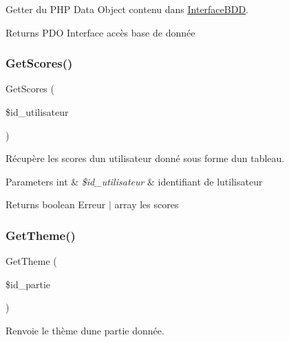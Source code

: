 Getter du P\+HP Data Object contenu dans \mbox{\hyperlink{class_interface_b_d_d}{Interface\+B\+DD}}. 

\begin{DoxyReturn}{Returns}
P\+DO Interface accès base de donnée 
\end{DoxyReturn}
\mbox{\label{class_interface_b_d_d_a0bed09747595044e2aef3e3ce363c126}} 
\subsubsection{\texorpdfstring{Get\+Scores()}{GetScores()}}
{\footnotesize\ttfamily Get\+Scores (\begin{DoxyParamCaption}\item[{}]{\$id\+\_\+utilisateur }\end{DoxyParamCaption})}



Récupère les scores d\textquotesingle{}un utilisateur donné sous forme d\textquotesingle{}un tableau. 


\begin{DoxyParams}[1]{Parameters}
int & {\em \$id\+\_\+utilisateur} & identifiant de l\textquotesingle{}utilisateur\\
\hline
\end{DoxyParams}
\begin{DoxyReturn}{Returns}
boolean Erreur $\vert$ array les scores 
\end{DoxyReturn}
\mbox{\label{class_interface_b_d_d_aa0363b9684feb940bb3ad88fc322bdc8}} 
\subsubsection{\texorpdfstring{Get\+Theme()}{GetTheme()}}
{\footnotesize\ttfamily Get\+Theme (\begin{DoxyParamCaption}\item[{}]{\$id\+\_\+partie }\end{DoxyParamCaption})}



Renvoie le thème d\textquotesingle{}une partie donnée. 


